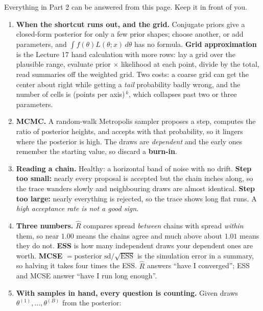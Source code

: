 \documentclass[11pt]{article}
\begin{document}
{\small

\noindent Everything in Part 2 can be answered from this page. Keep it in front of you.

\begin{enumerate}[label=\textbf{\arabic*.}, wide=0pt, itemsep=.4em, topsep=.5em]

\item \textbf{When the shortcut runs out, and the grid.} Conjugate priors give a closed-form
posterior for only a few prior shapes; choose another, or add parameters, and
$\int f(\theta)L(\theta;x)\,d\theta$ has no formula. \textbf{Grid approximation} is the Lecture 17
hand calculation with more rows: lay a grid over the plausible range, evaluate prior $\times$
likelihood at each point, divide by the total, read summaries off the weighted grid. Two costs: a
coarse grid can get the center about right while getting a \emph{tail} probability badly wrong, and
the number of cells is (points per axis)$^{\,k}$, which collapses past two or three parameters.

\item \textbf{MCMC.} A random-walk Metropolis sampler proposes a step, computes the ratio of
posterior heights, and accepts with that probability, so it lingers where the posterior is high. The
draws are \emph{dependent} and the early ones remember the starting value, so discard a
\textbf{burn-in}.

\item \textbf{Reading a chain.} Healthy: a horizontal band of noise with no drift. \textbf{Step too
small:} nearly every proposal is accepted but the chain inches along, so the trace wanders slowly and
neighbouring draws are almost identical. \textbf{Step too large:} nearly everything is rejected, so
the trace shows long flat runs. A \emph{high acceptance rate is not a good sign}.

\item \textbf{Three numbers.} $\widehat{R}$ compares spread \emph{between} chains with spread
\emph{within} them, so near $1.00$ means the chains agree and much above about $1.01$ means they do
not. \textbf{ESS} is how many independent draws your dependent ones are worth. \textbf{MCSE}
$= \text{posterior sd}/\sqrt{\text{ESS}}$ is the simulation error in a summary, so halving it takes
four times the ESS. $\widehat{R}$ answers ``have I converged''; ESS and MCSE answer ``have I run long
enough''.

\item \textbf{With samples in hand, every question is counting.} Given draws
$\theta^{(1)},\dots,\theta^{(B)}$ from the posterior:


\end{enumerate}}
\end{document}
